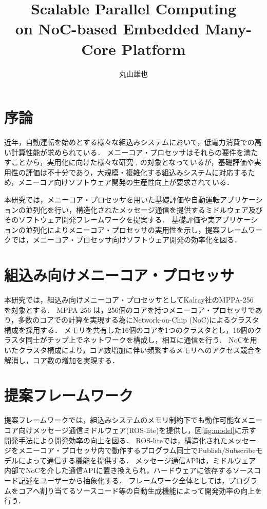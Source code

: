 \documentclass[a4j,10pt,twocolumn]{abstract}
\title{Scalable Parallel Computing \\ on NoC-based Embedded Many-Core Platform}	%
\author{丸山雄也} 		%
\begin{document}
\absttitle 		%

\section{序論}
近年，自動運転を始めとする様々な組込みシステムにおいて，低電力消費での高い計算性能が求められている．
メニーコア・プロセッサはそれらの要件を満たすことから，実用化に向けた様々な研究 \cite{BURGIO20172992}, \cite{de2013clustered2} の対象となっているが，基礎評価や実用性の評価は不十分であり，大規模・複雑化する組込みシステムに対応するため，メニーコア向けソフトウェア開発の生産性向上が要求されている．

本研究では，メニーコア・プロセッサを用いた基礎評価や自動運転アプリケーションの並列化を行い，構造化されたメッセージ通信を提供するミドルウェア及びそのソフトウェア開発フレームワークを提案する．
基礎評価や実アプリケーションの並列化によりメニーコア・プロセッサの実用性を示し，提案フレームワークでは，メニーコア・プロセッサ向けソフトウェア開発の効率化を図る．

\section{組込み向けメニーコア・プロセッサ}
本研究では，組込み向けメニーコア・プロセッサとしてKalray社のMPPA-256 \cite{de2013clustered2} を対象とする．
MPPA-256 は，256個のコアを持つメニーコア・プロセッサであり，多数のコアでの計算を実現する為にNetwork-on-Chip (NoC)によるクラスタ構成を採用する．
メモリを共有した16個のコアを1つのクラスタとし，16個のクラスタ同士がチップ上でネットワークを構成し，相互に通信を行う．
NoCを用いたクラスタ構成により，コア数増加に伴い頻繁するメモリへのアクセス競合を解消し，コア数の増加を実現する．

\section{提案フレームワーク}
提案フレームワークでは，組込みシステムのメモリ制約下でも動作可能なメニーコア向けメッセージ通信ミドルウェア(ROS-lite)を提供し，図\ref{fig:model}に示す開発手法により開発効率の向上を図る．
ROS-liteでは，構造化されたメッセージをメニーコア・プロセッサ内で動作するプログラム同士でPublish/Subscribeモデルによって通信する機能を提供する．
メッセージ通信APIは，ミドルウェア内部でNoCを介した通信APIに置き換えられ，ハードウェアに依存するソースコード記述をユーザーから抽象化する．
フレームワーク全体としては，プログラムをコアへ割り当てるソースコード等の自動生成機能によって開発効率の向上を行う．
\end{document}

